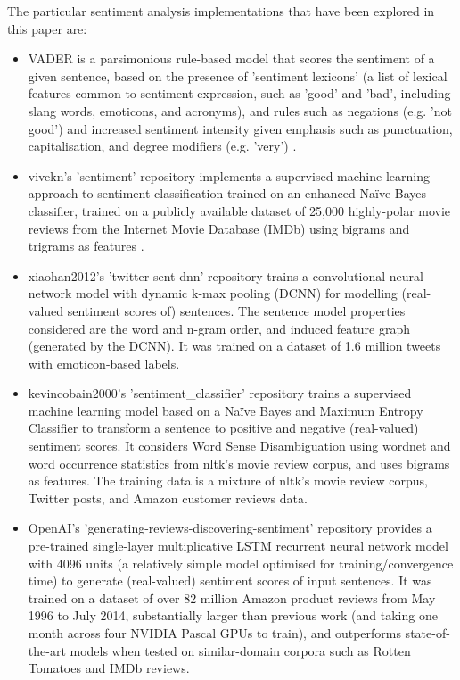 \documentclass{report}
\begin{document}
The particular sentiment analysis implementations that have been explored in this paper are:
\begin{itemize}
	\item VADER is a parsimonious rule-based model that scores the sentiment of a given sentence, based on the presence of 'sentiment lexicons' (a list of lexical features common to sentiment expression, such as 'good' and 'bad', including slang words, emoticons, and acronyms), and rules such as negations (e.g. 'not good') and increased sentiment intensity given emphasis such as punctuation, capitalisation, and degree modifiers (e.g. 'very') \cite{VADER}.
	\item vivekn's 'sentiment' repository implements a supervised machine learning approach to sentiment classification trained on an enhanced Na\"{i}ve Bayes classifier, trained on a publicly available dataset of 25,000 highly-polar movie reviews from the Internet Movie Database (IMDb) using bigrams and trigrams as features \cite{narayanan2013fast}. 
	\item xiaohan2012's 'twitter-sent-dnn' repository trains a convolutional neural network model with dynamic k-max pooling (DCNN) for modelling (real-valued sentiment scores of) sentences.
		The sentence model properties considered are the word and n-gram order, and induced feature graph (generated by the DCNN).
		It was trained on a dataset of 1.6 million tweets with emoticon-based labels. \cite{kalchbrennerACL2014}
	\item kevincobain2000's 'sentiment\_classifier' repository trains a supervised machine learning model based on a Na\"{i}ve Bayes and Maximum Entropy Classifier to transform a sentence to positive and negative (real-valued) sentiment scores.
		It considers Word Sense Disambiguation using wordnet and word occurrence statistics from nltk's movie review corpus, and uses bigrams as features.
		The training data is a mixture of nltk's movie review corpus, Twitter posts, and Amazon customer reviews data. \cite{kevincobain}
	\item OpenAI's 'generating-reviews-discovering-sentiment' repository provides a pre-trained single-layer multiplicative LSTM recurrent neural network model with 4096 units (a relatively simple model optimised for training/convergence time) to generate (real-valued) sentiment scores of input sentences.
		It was trained on a dataset of over 82 million Amazon product reviews from May 1996 to July 2014, substantially larger than previous work (and taking one month across four NVIDIA Pascal GPUs to train), and outperforms state-of-the-art models when tested on similar-domain corpora such as Rotten Tomatoes and IMDb reviews.

\end{itemize}
\end{document}
